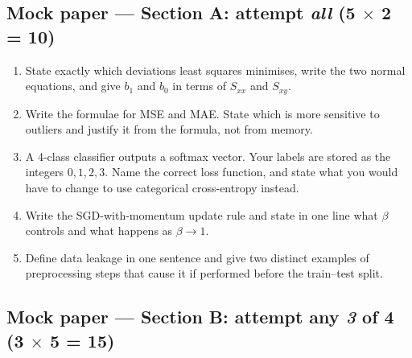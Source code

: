 \documentclass[11pt,a4paper]{article}
\begin{document}
\subsection*{Mock paper --- Section A: attempt \emph{all} \quad (5 $\times$ 2 = 10)}

\begin{enumerate}[label=\textbf{\arabic*.}, leftmargin=*]
  \item State exactly which deviations least squares minimises, write the two
    normal equations, and give $b_1$ and $b_0$ in terms of $S_{xx}$ and
    $S_{xy}$. 
  \item Write the formulae for MSE and MAE. State which is more sensitive to
    outliers and justify it from the formula, not from memory. 
  \item A 4-class classifier outputs a softmax vector. Your labels are stored
    as the integers $0,1,2,3$. Name the correct loss function, and state what
    you would have to change to use categorical cross-entropy instead. 
  \item Write the SGD-with-momentum update rule and state in one line what
    $\beta$ controls and what happens as $\beta \to 1$. 
  \item Define data leakage in one sentence and give two distinct examples of
    preprocessing steps that cause it if performed before the train--test split.
\end{enumerate}

\subsection*{Mock paper --- Section B: attempt any \emph{3} of 4 \quad (3 $\times$ 5 = 15)}
\end{document}
